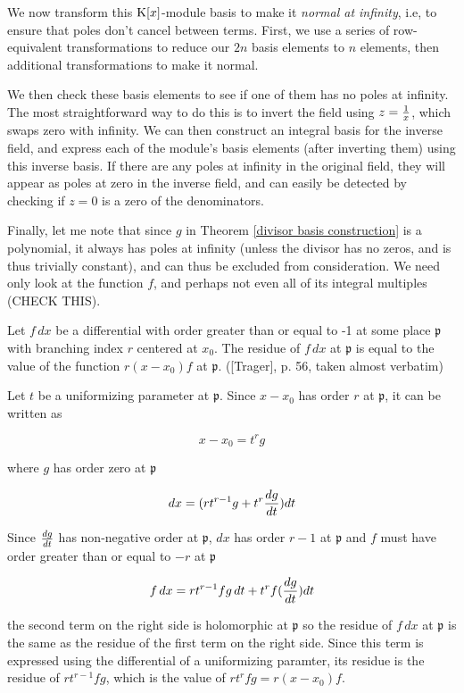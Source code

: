 We now transform this ${\rm K}[x]$-module basis to make it {\it normal
at infinity}, i.e, to ensure that poles don't cancel between terms.
First, we use a series of row-equivalent transformations to reduce our
$2n$ basis elements to $n$ elements, then additional transformations
to make it normal.

We then check these basis elements to see if one of them has no poles
at infinity.  The most straightforward way to do this is to invert the
field using $z={1\over x}$, which swaps zero with infinity.  We can
then construct an integral basis for the inverse field, and express
each of the module's basis elements (after inverting them) using this
inverse basis.  If there are any poles at infinity in the original
field, they will appear as poles at zero in the inverse field, and can
easily be detected by checking if $z=0$ is a zero of the denominators.

Finally, let me note that since $g$ in Theorem \ref{divisor basis
construction} is a polynomial, it always has poles at infinity (unless
the divisor has no zeros, and is thus trivially constant), and can
thus be excluded from consideration.  We need only look at the
function $f$, and perhaps not even all of its integral multiples
(CHECK THIS).

\theorem
\label{Trager's residue theorem}

Let $f \,dx$ be a differential with order greater than or equal to -1
at some place $\mathfrak{p}$ with branching index $r$ centered at
$x_0$.  The residue of $f \,dx$ at $\mathfrak{p}$ is equal to the
value of the function $r(x-x_0)f$ at $\mathfrak{p}$. ([Trager], p. 56,
taken almost verbatim)

\proof

Let $t$ be a uniformizing parameter at $\mathfrak{p}$.  Since
$x-x_0$ has order $r$ at $\mathfrak{p}$, it can be written as

$$x-x_0 = t^r g$$

where $g$ has order zero at $\mathfrak{p}$

$$dx = (rt^{r-1}g + t^r{{dg}\over{dt}})dt$$

Since ${dg}\over{dt}$ has non-negative order at $\mathfrak{p}$,
$dx$ has order $r-1$ at $\mathfrak{p}$ and $f$ must have order
greater than or equal to $-r$ at $\mathfrak{p}$

$$f\,dx = rt^{r-1}f g\, dt + t^rf({{dg}\over{dt}})dt$$

the second term on the right side is holomorphic at $\mathfrak{p}$ so
the residue of $f\,dx$ at $\mathfrak{p}$ is the same as the residue of
the first term on the right side.  Since this term is expressed using
the differential of a uniformizing paramter, its residue is the
residue of $rt^{r-1}fg$, which is the value of $rt^rfg = r(x-x_0)f$.

\endtheorem
